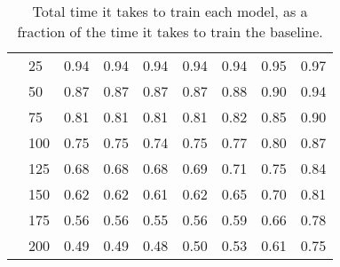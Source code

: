 \documentclass[11pt,a4paper]{article}
\begin{document}
\begin{table}[htp]
\begin{tabular}{@{}l@{\hspace{4pt}}l@{\hspace{4pt}}|RRRRR@{\hspace{-1pt}}R@{\hspace{-2pt}}R@{}}
&25  & 0.94 & 0.94 & 0.94 & 0.94 & 0.94 & 0.95 & 0.97 \\
&50  & 0.87 & 0.87 & 0.87 & 0.87 & 0.88 & 0.90 & 0.94 \\
&75  & 0.81 & 0.81 & 0.81 & 0.81 & 0.82 & 0.85 & 0.90 \\
&100 & 0.75 & 0.75 & 0.74 & 0.75 & 0.77 & 0.80 & 0.87 \\
&125 & 0.68 & 0.68 & 0.68 & 0.69 & 0.71 & 0.75 & 0.84 \\
&150 & 0.62 & 0.62 & 0.61 & 0.62 & 0.65 & 0.70 & 0.81 \\
&175 & 0.56 & 0.56 & 0.55 & 0.56 & 0.59 & 0.66 & 0.78 \\
&200 & 0.49 & 0.49 & 0.48 & 0.50 & 0.53 & 0.61 & 0.75 \\ \bottomrule
\end{tabular} \caption{\label{tab:ss_total_time} Total time it takes to train each model, as a fraction of the time it takes to train the baseline. }
\end{table}
\end{document}
